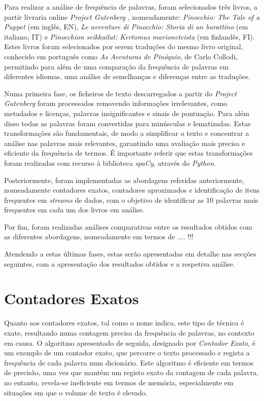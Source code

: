 \documentclass[mirror, portugues]{revdetua}
\begin{document}
Para realizar a análise de frequência de palavras, foram selecionados três livros, a partir livraria online \textit{Project Gutenberg} \cite{PG24}, nomeadamente: \textit{Pinocchio: The Tale of a Puppet} (em inglês, EN), \textit{Le avventure di Pinocchio: Storia di un burattino} (em italiano, IT) e \textit{Pinocchion seikkailut: Kertomus marioneteista} (em finlandês, FI). Estes livros foram selecionados por serem traduções do mesmo livro original, conhecido em português como \textit{As Aventuras de Pinóquio}, de Carlo Collodi, permitindo para além de uma comparação da frequência de palavras em diferentes idiomas, uma análise de semelhanças e diferenças entre as traduções.


Numa primeira fase, os ficheiros de texto descarregados a partir do \textit{Project Gutenberg} foram processados removendo informações irrelevantes, como metadados e licenças, palavras insignificantes e sinais de pontuação. Para além disso todas as palavras foram convertidas para minúsculas e lematizadas. Estas transformações são fundamentais, de modo a simplificar o texto e concentrar a análise nas palavras mais relevantes, garantindo uma avaliação mais precisa e eficiente da frequência de termos. É importante referir que estas transformações foram realizadas com recurso à biblioteca \textit{spaCy}, através do \textit{Python}.

Posteriormente, foram implementadas as abordagens referidas anteriormente, nomeadamente contadores exatos, contadores aproximados e identificação de itens frequentes em \textit{streams} de dados, com o objetivo de identificar as 10 palavras mais frequentes em cada um dos livros em análise.

Por fim, foram realizadas análises comparativas entre os resultados obtidos com as diferentes abordagens, nomeadamente em termos de .... !!! %

Atendendo a estas últimas fases, estas serão apresentadas em detalhe nas secções seguintes, com a apresentação dos resultados obtidos e a respetiva análise.


\section{Contadores Exatos}

Quanto aos contadores exatos, tal como o nome indica, este tipo de técnica é exate, resultando numa contagem precisa da frequência de palavras, no contexto em causa.
O algoritmo apresentado de seguida, designado por \textit{Contador Exato}, é um exemplo de um contador exato, que percorre o texto processado e regista a frequência de cada palavra num dicionário. Este algoritmo é eficiente em termos de precisão, uma vez que mantém um registo exato da contagem de cada palavra, no entanto, revela-se ineficiente em termos de memória, especialmente em situações em que o volume de texto é elevado.
\end{document}
